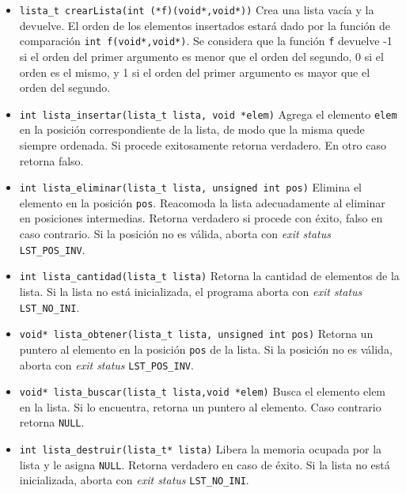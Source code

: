 \documentclass[12pt,a4paper]{article}
\begin{document}
\begin{itemize}

  \item \texttt{lista\_t  crearLista(int (*f)(void*,void*))} Crea una lista vacía y la devuelve. El orden de los elementos insertados estará dado por la función de comparación \texttt{int f(void*,void*)}. Se considera que la función \texttt{f} devuelve -1 si el orden del primer argumento es menor que el orden del segundo, 0 si el orden es el mismo, y 1 si el orden del primer argumento es mayor que el orden del segundo.

  \item \texttt{int lista\_insertar(lista\_t lista,  void *elem)}
    Agrega el elemento \texttt{elem} en la posición correspondiente de la lista, de modo que la misma quede siempre ordenada.
    Si procede exitosamente retorna verdadero. En otro caso retorna falso.

  \item \texttt{int lista\_eliminar(lista\_t lista, unsigned int pos)} Elimina
    el elemento en la posición \texttt{pos}. Reacomoda la lista adecuadamente
    al eliminar en posiciones intermedias. Retorna verdadero si procede con
    éxito, falso en caso contrario. Si la posición no es válida, aborta con
    \emph{exit status} \texttt{LST\_POS\_INV}.

  \item \texttt{int lista\_cantidad(lista\_t lista)} Retorna la cantidad de
    elementos de la lista. Si la lista no está inicializada, el programa aborta
    con \emph{exit status} \texttt{LST\_NO\_INI}.

  \item \texttt{void* lista\_obtener(lista\_t lista, unsigned int pos)} Retorna
    un puntero al elemento en la posición \texttt{pos} de la lista. Si la posición no es
    válida, aborta con \emph{exit status} \texttt{LST\_POS\_INV}.

 \item \texttt{void* lista\_buscar(lista\_t lista,void *elem)} Busca el elemento elem 
    en la lista. Si lo encuentra, retorna un puntero al elemento. Caso contrario 
    retorna \texttt{NULL}.


  \item \texttt{int lista\_destruir(lista\_t* lista)} Libera la memoria ocupada
    por la lista y le asigna \texttt{NULL}. Retorna verdadero en caso de éxito.
    Si la lista no está inicializada, aborta con \emph{exit status}
    \texttt{LST\_NO\_INI}.

\end{itemize}
\end{document}
